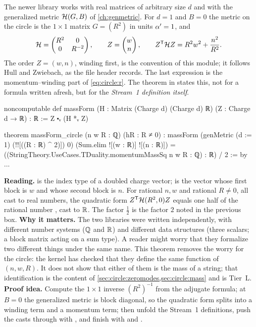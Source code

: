 The newer library  works with real matrices of arbitrary size $d$ and
with the generalized metric $\mathcal{H}(G,B)$ of \cref{ch:genmetric}. For $d=1$ and $B=0$ the
metric on the circle is the $1\times1$ matrix $G=(R^2)$ in units $\alpha'=1$, and
\[
 \mathcal{H}=\begin{pmatrix}R^2&0\\0&R^{-2}\end{pmatrix},\qquad
 Z=\begin{pmatrix}w\\n\end{pmatrix},\qquad
 Z^{\mathsf T}\mathcal{H} Z=R^2w^2+\frac{n^2}{R^2}.
\]
The order $Z=(w,n)$, winding first, is the convention of this module; it follows
Hull and Zwiebach, as the file header records. The last expression is the momentum--winding
part of \eqref{eq:circle:r}. The theorem  in
 states this, not for a formula written afresh,
but for the \emph{Stream~1 definition itself}.

\begin{leanbox}
\begin{leancode}
noncomputable def massForm (H : Matrix (Charge d) (Charge d) ℝ)
    (Z : Charge d → ℝ) : ℝ :=
  Z ⬝ᵥ (H *ᵥ Z)

theorem massForm_circle (n w R : ℚ) (hR : R ≠ 0) :
    massForm (genMetric (d := 1) (!![((R : ℝ) ^ 2)]) 0)
        (Sum.elim ![(w : ℝ)] ![(n : ℝ)]) =
      ((StringTheory.UseCases.TDuality.momentumMassSq n w R : ℚ) : ℝ) / 2 := by ...
\end{leancode}
\textbf{Reading.}  is the index type  of a doubled charge
vector;  is the vector whose first block is $w$ and whose second
block is $n$. For rational $n,w$ and rational $R\neq0$, all cast to real numbers, the quadratic
form $Z^{\mathsf T}\mathcal{H}(R^2,0)Z$ equals one half of the rational number
, cast to $\mathbb{R}$. The factor $\frac12$ is the factor $2$ noted in the
previous box. \textbf{Why it matters.} The two libraries were written independently, with
different number systems ($\mathbb{Q}$ and $\mathbb{R}$) and different data structures (three scalars; a
block matrix acting on a sum type). A reader might worry that they formalize two different
things under the same name. This theorem removes the worry for the circle: the kernel has
checked that they define the same function of $(n,w,R)$. It does not show that either of them
is the mass of a string; that identification is the content of
\cref{sec:circle:zeromodes,sec:circle:mass} and is Tier~L.
\textbf{Proof idea.} Compute the $1\times1$ inverse $(R^2)^{-1}$ from the adjugate formula; at
$B=0$ the generalized metric is block diagonal, so the quadratic form splits into a winding
term and a momentum term; then unfold the Stream~1 definitions, push the casts through with
, and finish with  and .
\end{leanbox}


